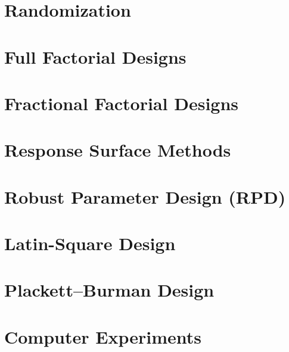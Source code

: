 \section{Randomization}



\section{Full Factorial Designs}
\section{Fractional Factorial Designs}
\section{Response Surface Methods}
\section{Robust Parameter Design (RPD)}
\section{Latin-Square Design}
\section{Plackett–Burman Design}
\section{Computer Experiments}

